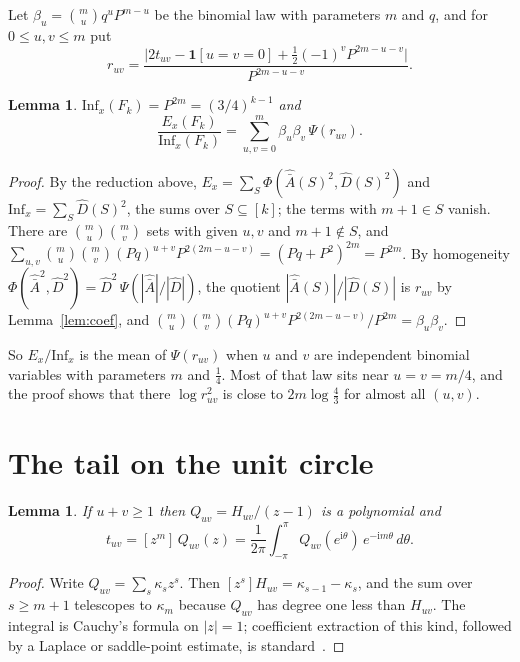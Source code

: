 \documentclass[11pt]{amsart}
\newtheorem{lemma}[theorem]{Lemma}
\theoremstyle{remark}
\newcommand{\Inf}{\mathrm{Inf}}
\newcommand{\ii}{\mathrm{i}}
\begin{document}
Let $\beta_u=\binom mu q^uP^{m-u}$ be the binomial law with parameters $m$ and $q$, and for $0\le u,v\le m$ put
\[
r_{uv}=\frac{\bigl|2t_{uv}-\mathbf 1[u=v=0]+\frac12(-1)^vP^{2m-u-v}\bigr|}{P^{2m-u-v}}.
\]

\begin{lemma}\label{lem:sum}
$\Inf_x(F_k)=P^{2m}=(3/4)^{k-1}$ and
\[
\frac{E_x(F_k)}{\Inf_x(F_k)}=\sum_{u,v=0}^m\beta_u\beta_v\,\Psi(r_{uv}).
\]
\end{lemma}

\begin{proof}
By the reduction above, $E_x=\sum_S\Phi(\hat{\bar A}(S)^2,\hat D(S)^2)$ and $\Inf_x=\sum_S\hat D(S)^2$, the sums over
$S\subseteq[k]$; the terms with $m+1\in S$ vanish. There are $\binom mu\binom mv$ sets with given $u,v$ and $m+1\notin
S$, and $\sum_{u,v}\binom mu\binom mv(Pq)^{u+v}P^{2(2m-u-v)}=(Pq+P^2)^{2m}=P^{2m}$. By homogeneity
$\Phi(\hat{\bar A}^2,\hat D^2)=\hat D^2\,\Psi(|\hat{\bar A}|/|\hat D|)$, the quotient $|\hat{\bar A}(S)|/|\hat D(S)|$ is
$r_{uv}$ by Lemma~\ref{lem:coef}, and $\binom mu\binom mv(Pq)^{u+v}P^{2(2m-u-v)}/P^{2m}=\beta_u\beta_v$.
\end{proof}

So $E_x/\Inf_x$ is the mean of $\Psi(r_{uv})$ when $u$ and $v$ are independent binomial variables with parameters $m$ and
$\frac14$. Most of that law sits near $u=v=m/4$, and the proof shows that there $\log r_{uv}^2$ is close to
$2m\log\frac43$ for almost all $(u,v)$.

\section{The tail on the unit circle}\label{sec:circle}

\begin{lemma}\label{lem:integral}
If $u+v\ge1$ then $Q_{uv}=H_{uv}/(z-1)$ is a polynomial and
\[
t_{uv}=[z^m]\,Q_{uv}(z)=\frac1{2\pi}\int_{-\pi}^{\pi}Q_{uv}(e^{\ii\theta})\,e^{-\ii m\theta}\,d\theta .
\]
\end{lemma}

\begin{proof}
Write $Q_{uv}=\sum_s\kappa_sz^s$. Then $[z^s]H_{uv}=\kappa_{s-1}-\kappa_s$, and the sum over $s\ge m+1$ telescopes to $\kappa_m$ because
$Q_{uv}$ has degree one less than $H_{uv}$. The integral is Cauchy's formula on $|z|=1$; coefficient extraction of this kind, followed by a Laplace or
saddle-point estimate, is standard~\cite[Chapter~VIII]{FS09}.
\end{proof}
\end{document}
